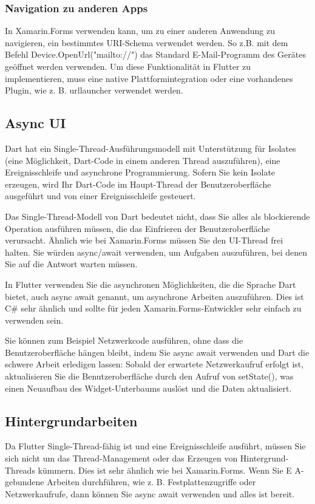 \subsubsection{Navigation zu anderen Apps}
In Xamarin.Forms verwenden kann, um zu einer anderen Anwendung zu navigieren, ein bestimmtes URI-Schema verwendet werden.  So z.B. mit dem Befehl Device.OpenUrl("mailto://") das Standard E-Mail-Programm des Gerätes geöffnet werden verwenden.
Um diese Funktionalität in Flutter zu implementieren,  muss eine native Plattformintegration oder eine vorhandenes Plugin, wie z. B. urllauncher verwendet werden.  
\subsection{Async UI}
Dart hat ein Single-Thread-Ausführungsmodell mit Unterstützung für Isolates (eine Möglichkeit, Dart-Code in einem anderen Thread auszuführen), eine Ereignisschleife und asynchrone Programmierung. Sofern Sie kein Isolate erzeugen, wird Ihr Dart-Code im Haupt-Thread der Benutzeroberfläche ausgeführt und von einer Ereignisschleife gesteuert.

Das Single-Thread-Modell von Dart bedeutet nicht, dass Sie alles als blockierende Operation ausführen müssen, die das Einfrieren der Benutzeroberfläche verursacht. Ähnlich wie bei Xamarin.Forms müssen Sie den UI-Thread frei halten. Sie würden async/await verwenden, um Aufgaben auszuführen, bei denen Sie auf die Antwort warten müssen.

In Flutter verwenden Sie die asynchronen Möglichkeiten, die die Sprache Dart bietet, auch async await genannt, um asynchrone Arbeiten auszuführen. Dies ist C\# sehr ähnlich und sollte für jeden Xamarin.Forms-Entwickler sehr einfach zu verwenden sein.

Sie können zum Beispiel Netzwerkcode ausführen, ohne dass die Benutzeroberfläche hängen bleibt, indem Sie async await verwenden und Dart die schwere Arbeit erledigen lassen:
Sobald der erwartete Netzwerkaufruf erfolgt ist, aktualisieren Sie die Benutzeroberfläche durch den Aufruf von setState(), was einen Neuaufbau des Widget-Unterbaums auslöst und die Daten aktualisiert.
\subsection{Hintergrundarbeiten}
Da Flutter Single-Thread-fähig ist und eine Ereignisschleife ausführt, müssen Sie sich nicht um das Thread-Management oder das Erzeugen von Hintergrund-Threads kümmern. Dies ist sehr ähnlich wie bei Xamarin.Forms. Wenn Sie E A-gebundene Arbeiten durchführen, wie z. B. Festplattenzugriffe oder Netzwerkaufrufe, dann können Sie async await verwenden und alles ist bereit.

